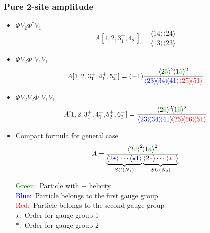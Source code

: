 \documentclass{beamer}
\newcommand{\avg}[1]{\langle #1 \rangle}
\newcommand{\mdavg}[2]{\langle #1 \rangle\!\langle #2 \rangle}
\newcommand{\asqu}[1]{{\langle#1\rangle}^2}
\begin{document}
\begin{frame}
    \frametitle{Pure 2-site amplitude}
    \begin{itemize}
        \item $\Phi V_2 \Phi^\dagger V_1$
        \begin{equation*}
            A[1,2,3_1^+,4_2^-]=\frac{\mdavg{14}{24}}{\mdavg{13}{23}}
        \end{equation*}
        \item $\Phi V_2 \Phi^\dagger V_1V_1$
        \begin{equation*}
            A[1,2,3_1^+,4_1^+,5_2^-]=(-1)\frac{\avg{2\textcolor{green}{5}}^2\!\avg{1\textcolor{green}{5}}^2}{\textcolor{blue}{\mdavg{23}{34}\!\avg{41}}\textcolor{red}{\mdavg{25}{51}}}
        \end{equation*}
        \item $\Phi V_2V_2 \Phi^\dagger V_1V_1$
        \begin{equation*}
            A[1,2,3_1^+,4_1^+,5_2^+,6_2^-]=\frac{\avg{2\textcolor{green}{6}}^2\!\avg{1\textcolor{green}{6}}^2}{\textcolor{blue}{\mdavg{23}{34}\!\avg{41}}\!\textcolor{red}{\mdavg{25}{56}\!\avg{51}}}
        \end{equation*}       
    \end{itemize}
\end{frame}

\begin{frame}
    \begin{itemize}
        \item Compact formula for general case
        \begin{equation*}
            A=\frac{\asqu{2\textcolor{green}{a}}\!\asqu{1\textcolor{green}{a}}}{\underbrace{\avg{2\textcolor{blue}{\star}}\cdots \avg{\textcolor{blue}{\star}1}}_{SU(N_1)}\underbrace{\avg{2\textcolor{red}{\ast} }\cdots \avg{\textcolor{red}{\ast} 1}}_{SU(N_2)}}
        \end{equation*} 
        \begin{minipage}{0.7\textwidth}
            \raggedright  %
            \textcolor{green}{Green:} \,Particle with $-$ helicity\\
            \textcolor{blue}{Blue:}\, Particle belongs to the first gauge group\\
            \textcolor{red}{Red:}\, Particle belongs to the second gauge group\\
            $\star$: \,Order for gauge group 1\\
            $\ast$: \,Order for gauge group 2 
            \end{minipage}
       
    \end{itemize}
\end{frame}
\end{document}
